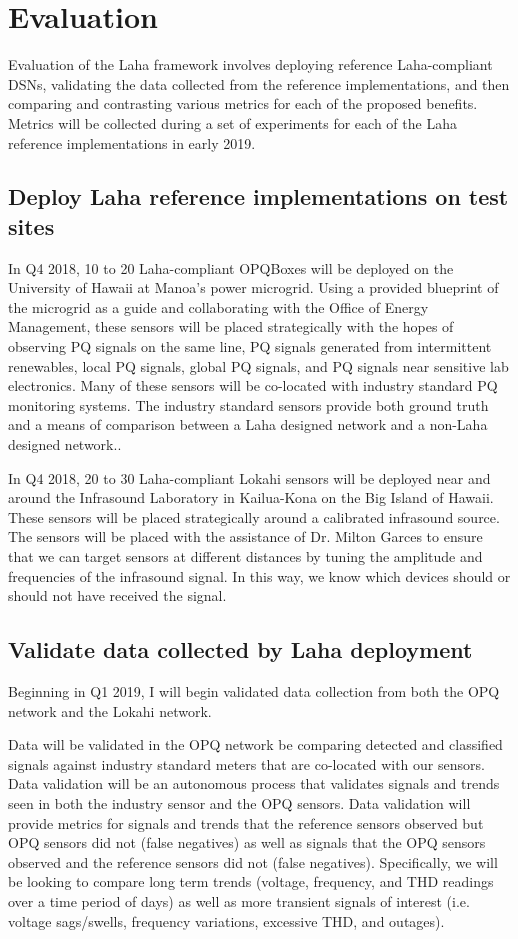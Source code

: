 \chapter{Evaluation}
Evaluation of the Laha framework involves deploying reference Laha-compliant DSNs, validating the data collected from the reference implementations, and then comparing and contrasting various metrics for each of the proposed benefits. Metrics will be collected during a set of experiments for each of the Laha reference implementations in early 2019. 

\section{Deploy Laha reference implementations on test sites}
In Q4 2018, 10 to 20 Laha-compliant OPQBoxes will be deployed on the University of Hawaii at Manoa's power microgrid. Using a provided blueprint of the microgrid as a guide and collaborating with the Office of Energy Management, these sensors will be placed strategically with the hopes of observing PQ signals on the same line, PQ signals generated from intermittent renewables, local PQ signals, global PQ signals, and PQ signals near sensitive lab electronics. Many of these sensors will be co-located with industry standard PQ monitoring systems. The industry standard sensors provide both ground truth and a means of comparison between a Laha designed network and a non-Laha designed network.. 

In Q4 2018,  20 to 30 Laha-compliant Lokahi sensors will be deployed near and around the Infrasound Laboratory in Kailua-Kona on the Big Island of Hawaii. These sensors will be placed strategically around a calibrated infrasound source. The sensors will be placed with the assistance of Dr. Milton Garces to ensure that we can target sensors at different distances by tuning the amplitude and frequencies of the infrasound signal. In this way, we know which devices should or should not have received the signal.

\section{Validate data collected by Laha deployment}
Beginning in Q1 2019, I will begin validated data collection from both the OPQ network and the Lokahi network. 

Data will be validated in the OPQ network be comparing detected and classified signals against industry standard meters that are co-located with our sensors. Data validation will be an autonomous process that validates signals and trends seen in both the industry sensor and the OPQ sensors. Data validation will provide metrics for signals and trends that the reference sensors observed but OPQ sensors did not (false negatives) as well as signals that the OPQ sensors observed and the reference sensors did not (false negatives).  Specifically, we will be looking to compare long term trends (voltage, frequency, and THD readings over a time period of days) as well as more transient signals of interest (i.e. voltage sags/swells, frequency variations, excessive THD, and outages).

